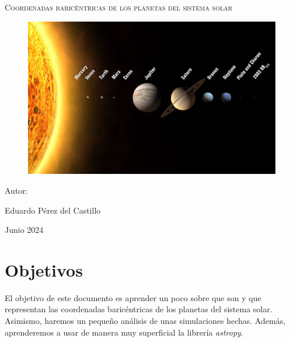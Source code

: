 \documentclass[12pt]{article}
\begin{document}
\renewcommand{\baselinestretch}{1.5}

\begin{titlepage}
    \centering
    {\bfseries\LARGE  \par}
    \vspace{1cm}
    {\scshape\Large  \par}
    \vspace{3cm}
    {\scshape\Huge Coordenadas baricéntricas de los planetas del sistema solar
 \par}
 \vspace{10mm}
 \begin{figure}[!h]
    \centering
    \includegraphics[scale=0.5]{sistema.png}
\end{figure}
    \vspace{3cm}
    {\itshape\Large  \par}
    \vfill
    {\Large Autor: \par}
    {\Large Eduardo Pérez del Castillo\par}
    \vfill
    {\Large Junio 2024 \par}

\end{titlepage}

\newpage

\section{Objetivos}
El objetivo de este documento es aprender un poco sobre que son
y que representan las coordenadas baricéntricas de los planetas del sistema
solar. Asimismo, haremos un pequeño análisis de unas simulaciones hechas. Además, aprenderemos
a usar de manera muy superficial la librería \textit{astropy}.
\end{document}
